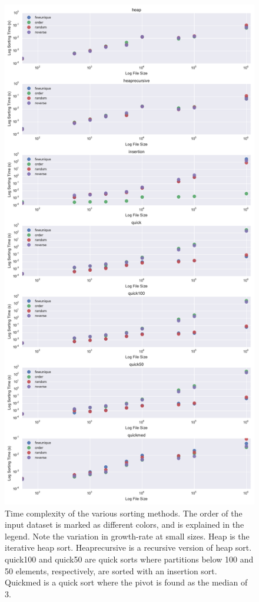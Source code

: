 \documentclass[a4paper,12pt]{article}
\begin{document}
\begin{figure}[h]
    \centering
    \includegraphics[width=.8\textwidth]{sorting_efficiency.pdf}
    \caption{Time complexity of the various sorting methods.  The order of the input dataset is marked as different colors, and is explained in the legend.  Note the variation in growth-rate at small sizes.  Heap is the iterative heap sort.  Heaprecursive is a recursive version of heap sort.  quick100 and quick50 are quick sorts where partitions below 100 and 50 elements, respectively, are sorted with an insertion sort.  Quickmed is a quick sort where the pivot is found as the median of 3.}
    \label{fig:mesh1}
\end{figure}
\end{document}
